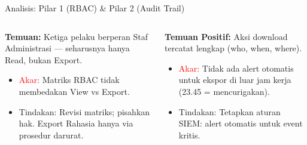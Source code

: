 \documentclass[aspectratio=169,11pt]{beamer}
\begin{document}
\begin{frame}{Analisis: Pilar 1 (RBAC) \& Pilar 2 (Audit Trail)}
    \vspace{0.2cm}
    \begin{columns}[T]
        \begin{premiumbox}
            \scriptsize
            \textbf{Temuan:} Ketiga pelaku berperan Staf Administrasi --- seharusnya hanya Read, bukan Export.
            \vspace{0.1cm}
            \begin{itemize}
                \item \textcolor{red}{Akar:} Matriks RBAC tidak membedakan View vs Export.
                \item \textcolor{plnblue}{Tindakan:} Revisi matriks; pisahkan hak. Export Rahasia hanya via prosedur darurat.
            \end{itemize}
        \end{premiumbox}
        
        \begin{orangebox}
            \scriptsize
            \textbf{Temuan Positif:} Aksi download tercatat lengkap (who, when, where).
            \vspace{0.1cm}
            \begin{itemize}
                \item \textcolor{red}{Akar:} Tidak ada alert otomatis untuk ekspor di luar jam kerja (23.45 = mencurigakan).
                \item \textcolor{plnblue}{Tindakan:} Tetapkan aturan SIEM: alert otomatis untuk event kritis.
            \end{itemize}
        \end{orangebox}
    \end{columns}
\end{frame}
\end{document}
